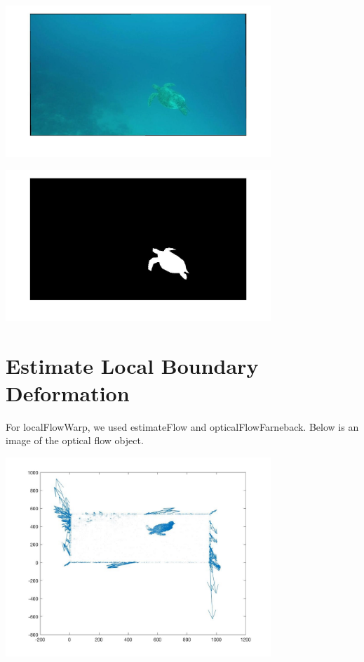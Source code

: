 \documentclass{article}
\begin{document}
	\begin{center}
		\includegraphics[width=100mm]{img/i7}
	\end{center}

	\begin{center}
		\includegraphics[width=100mm]{img/i8}
	\end{center}

	\section{Estimate Local Boundary Deformation}
	For localFlowWarp, we used estimateFlow and opticalFlowFarneback. Below is an image of the optical flow object.
	
	\begin{center}
		\includegraphics[width=100mm]{img/i9}
	\end{center}
	
\end{document}
